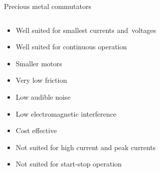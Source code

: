 \documentclass[compress]{beamer}
\begin{document}
\begin{frame}{Precious metal commutators}

    \begin{columns}
        \begin{column}{0.6\linewidth}
            \begin{itemize}
                \item Well suited for smallest currents and~voltages
                \item Well suited for continuous operation
                \item Smaller motors
                \item Very low friction
                \item Low audible noise
                \item Low electromagnetic interference
                \item Cost effective
                \item Not suited for high current and peak currents
                \item Not suited for start-stop operation
            \end{itemize}

        \end{column}
        \begin{column}{0.4\linewidth}
            \begin{center}
            \end{center}
        \end{column}
    \end{columns}

\end{frame}
\end{document}
